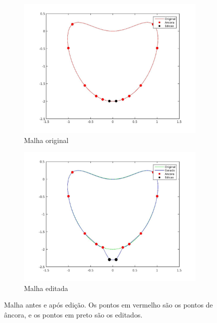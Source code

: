 \begin{frame}
\begin{figure}[ht!]
	\centering
	\begin{subfigure}[b]{0.47\textwidth}
		\centering
		\includegraphics[trim={5cm, 2cm, 3cm, 2cm},clip,width=\textwidth]{imagens/malhaoriginal.jpg}
		\caption{Malha original}
		\label{fig:meshorigiedit}
	\end{subfigure}
	\hfill
	\begin{subfigure}[b]{0.47\textwidth}
		\centering
		\includegraphics[trim={5cm, 2cm, 3cm, 2cm},clip,width=\textwidth]{imagens/malhaedicao.jpg}
		\caption{Malha editada}
		\label{fig:mesheditededit}
	\end{subfigure}
	\caption{Malha antes e após edição. Os pontos em vermelho são os pontos de âncora, e os pontos em preto são os editados.}
	\label{fig:editedmesh}
\end{figure}

\end{frame}